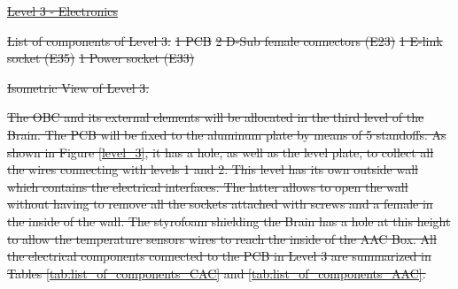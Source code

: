 \documentclass[a4paper,12pt,twoside]{article}
\providecommand{\DIFdeltex}[1]{{\protect\color{red}\sout{#1}}}                      %
\providecommand{\DIFdelFL}[1]{\DIFdel{#1}} %
\providecommand{\DIFdel}[1]{\texorpdfstring{\DIFdeltex{#1}}{}} %
\begin{document}
\underline{\DIFdel{Level 3 - Electronics}}

\DIFdel{List of components of Level 3:
}%
\DIFdel{1 PCB
    }%
\DIFdel{2 D-Sub female connectors (E23)
    }%
\DIFdel{1 E-link socket (E35)
    }%
\DIFdel{1 Power socket (E33)
}%

{%
\DIFdelFL{Isometric View of Level 3.}}

\DIFdel{The OBC and its external elements will be allocated in the third level of the Brain. The PCB will be fixed to the aluminum plate by means of 5 standoffs. As shown in Figure \ref{level_3}, it has a hole, as well as the level plate, to collect all the wires connecting with levels 1 and 2. This level has its own outside wall which contains the electrical interfaces. The latter allows to open the wall without having to remove all the sockets attached with screws and a female in the inside of the wall. The styrofoam shielding the Brain has a hole at this height to allow the temperature sensors wires to reach the inside of the AAC Box. All the electrical components connected to the PCB in Level 3 are summarized in Tables \ref{tab:list_of_components_CAC} and \ref{tab:list_of_components_AAC}.
}%

\end{document}
